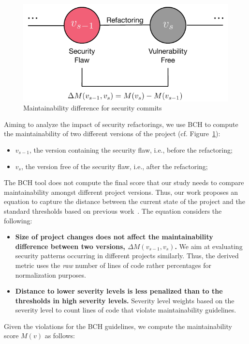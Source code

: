 \documentclass[sigconf,review]{acmart}
\begin{document}
\begin{figure}[h]
 	\centering 	\includegraphics[width=0.75\linewidth]{figures/commit.pdf}
 	\caption{Maintainability difference for security commits}
	\label{fig:commit}
\end{figure}

Aiming to analyze the impact of security refactorings, we use BCH to compute the
maintainability of two different versions of the project (cf. Figure~\ref{fig:commit}):
\begin{itemize}
	\item $v_{s-1}$, the version containing the security flaw, i.e., before the
	refactoring;
	\item $v_{s}$, the version free of the security flaw, i.e., after the
	refactoring;
\end{itemize}

The BCH tool does not compute the final score that our study needs to compare
maintainability amongst different project versions. Thus, our work proposes an
equation to capture the distance between the current state of the project and
the standard thresholds based on previous work~\cite{Olivari:2018}. The equation
considers the following:
\begin{itemize}
	\item \textbf{Size of project changes does not affect the maintainability
	difference between two versions, $\Delta M (v_{s-1},v_{s})$.} We
	aim at evaluating security patterns occurring in different projects similarly.
	Thus, the derived metric uses the \textit{raw} number of lines of code rather
  percentages for normalization purposes.
	\item \textbf{Distance to lower severity levels is less penalized than to the
	thresholds in high severity levels.} Severity level weights based on the
	severity level to count lines of code that violate maintainability guidelines.
\end{itemize}

Given the violations for the BCH guidelines, we compute the maintainability score
$M(v)$ as follows:
\end{document}
